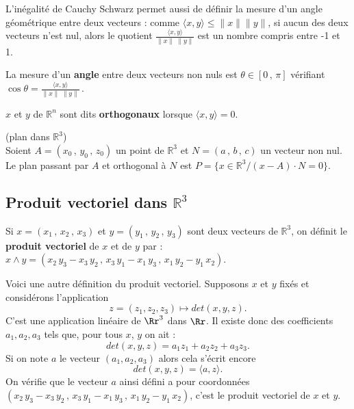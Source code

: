 \documentclass[class=report,crop=false]{standalone}
\begin{document}
L'inégalité de Cauchy Schwarz permet aussi de définir la mesure d'un angle géométrique entre deux vecteurs : comme $ \langle x, y\rangle\leq\|x\|\|y\|$, si aucun des deux vecteurs n'est nul, alors le quotient  $\displaystyle \frac{\langle x, y \rangle}{\|x\|\;\|y\|}$ est un nombre compris entre -1 et 1. 

\begin{definition} La mesure d'un {\bf angle} entre deux vecteurs non nuls est $\theta \in [0\,,\,\pi]$ vérifiant $\cos \theta = \displaystyle \frac{\langle x, y \rangle}{\|x\|\;\|y\|}$\,.
\end{definition}

\begin{definition}
$x$ et $y$ de $\mathbb{R}^n$ sont dits {\bf orthogonaux} lorsque $\langle x, y \rangle = 0$.
\end{definition}

\begin{definition} (plan dans $\mathbb{R}^3$)\\
Soient $A = (x_{0}\,,\,y_{0}\,,\,z_{0})$ un point de $\mathbb{R}^3$ et $N = (a\,,\,b\,,\,c)$ un vecteur non nul. \\
Le plan passant par $A$ et orthogonal \`a $N$ est $P = \lbrace x \in \mathbb{R}^3 / (x - A) \cdot N = 0 \rbrace$.
\end{definition}


\subsection{Produit vectoriel dans $\mathbb{R}^3$}


\begin{definition}
Si $x = (x_{1}\,,\,x_{2}\,,\,x_{3})$ et $y = (y_{1}\,,\,y_{2}\,,\,y_{3})$ sont deux vecteurs de $\mathbb{R}^3$, on définit le {\bf  produit vectoriel} de $x$ et de $y$ par : $x \land y = (x_{2}\,y_{3} - x_{3}\,y_{2}\,,\,x_{3}\,y_{1} - x_{1}\,y_{3}\,,\,x_{1}\,y_{2} - y_{1}\,x_{2})$.
\end{definition}

Voici une autre définition du produit vectoriel. Supposons $x$ et $y$ fixés et considérons l'application
$$
z=(z_1,z_2,z_3)\mapsto det(x,y,z).
$$
C'est une application linéaire de $\Rr^3$ dans $\Rr$. Il existe donc des coefficients $a_1,a_2,a_3$ tels que, pour tous $x$, $y$ on ait :
$$
det(x,y,z)=a_1z_1+a_2z_2+a_3z_3.
$$
Si on note $a$ le vecteur $(a_1,a_2,a_3)$ alors cela s'écrit encore
$$
det(x,y,z)=\langle a,z\rangle.
$$
On vérifie que le vecteur $a$ ainsi défini a pour coordonnées $(x_{2}\,y_{3} - x_{3}\,y_{2}\,,\,x_{3}\,y_{1} - x_{1}\,y_{3}\,,\,x_{1}\,y_{2} - y_{1}\,x_{2})$, c'est le produit vectoriel de $x$ et $y$.
\end{document}
